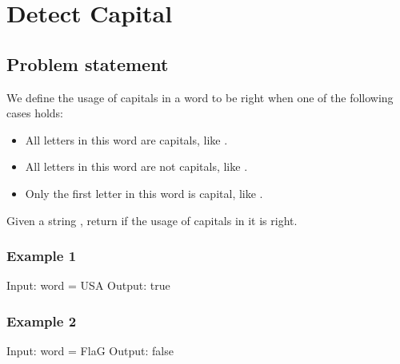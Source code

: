 \documentclass[letterpaper,12pt,english]{book}
\begin{document}
\section{Detect Capital}
\label{\detokenize{String/08_STR_520_Detect_Capital:detect-capital}}\label{\detokenize{String/08_STR_520_Detect_Capital::doc}}

\subsection{Problem statement\sphinxfootnotemark[30]}
\label{\detokenize{String/08_STR_520_Detect_Capital:problem-statement}}%
\begin{footnotetext}[30]\sphinxAtStartFootnote
{}
%
\end{footnotetext}\ignorespaces 
\sphinxAtStartPar
We define the usage of capitals in a word to be right when one of the following cases holds:
\begin{itemize}
\item {} 
\sphinxAtStartPar
All letters in this word are capitals, like .

\item {} 
\sphinxAtStartPar
All letters in this word are not capitals, like .

\item {} 
\sphinxAtStartPar
Only the first letter in this word is capital, like .

\end{itemize}

\sphinxAtStartPar
Given a string , return  if the usage of capitals in it is right.


\subsubsection{Example 1}
\label{\detokenize{String/08_STR_520_Detect_Capital:example-1}}
\begin{sphinxVerbatim}[commandchars=\\\{\}]
Input: word = \PYGZdq{}USA\PYGZdq{}
Output: true
\end{sphinxVerbatim}


\subsubsection{Example 2}
\label{\detokenize{String/08_STR_520_Detect_Capital:example-2}}
\begin{sphinxVerbatim}[commandchars=\\\{\}]
Input: word = \PYGZdq{}FlaG\PYGZdq{}
Output: false
\end{sphinxVerbatim}
\end{document}
